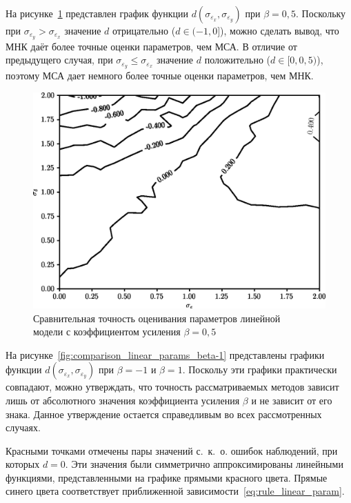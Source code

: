 На рисунке~\ref{fig:comparison_linear_params_beta-0,5}
представлен график функции \( d(\sigma_{\varepsilon_x}, \sigma_{\varepsilon_y}) \)
при \( \beta = 0{,}5 \).
Поскольку при \( \sigma_{\varepsilon_y} > \sigma_{\varepsilon_x} \)
значение \( d \) отрицательно (\( d \in ( -1, 0 ] \)),
можно сделать вывод, что МНК даёт более точные оценки параметров, чем МСА.
В отличие от предыдущего случая,
при \( \sigma_{\varepsilon_y} \le \sigma_{\varepsilon_x} \)
значение \( d \) положительно (\( d \in [0, 0{,}5 ) \)),
поэтому МСА дает немного более точные оценки параметров, чем МНК.

\begin{figure}[t]
  \centering
  \includegraphics[width=135mm]{fig/linear/param/beta-0,5_param.png}
  \caption{%
    Сравнительная точность оценивания параметров линейной \\
    модели с коэффициентом усиления \( \beta = 0{,}5 \)
  }\label{fig:comparison_linear_params_beta-0,5}
\end{figure}

\pagebreak
На рисунке~\ref{fig:comparison_linear_params_beta-1}
представлены графики функции \( d(\sigma_{\varepsilon_x}, \sigma_{\varepsilon_y}) \)
при \( \beta = -1 \) и \( \beta = 1 \).
Поскольу эти графики практически совпадают, можно утверждать, что точность рассматриваемых
методов зависит лишь от абсолютного значения коэффициента усиления \( \beta \) и
не зависит от его знака.
Данное утверждение остается справедливым во всех рассмотренных случаях.

Красными точками отмечены пары значений с.~к.~о. ошибок наблюдений, при которых \( d = 0 \).
Эти значения были симметрично аппроксимированы линейными функциями,
представленными на графике прямыми красного цвета.
Прямые синего цвета соответствует приближенной зависимости~\eqref{eq:rule_linear_param}.


